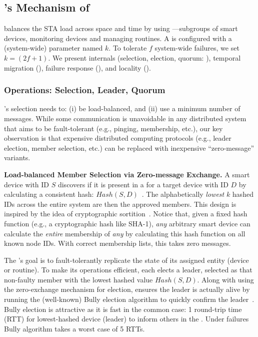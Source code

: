 \subsection{\sysname{}'s  Mechanism of \Kgroups  }
\label{comesh:section:design}

\sysname{} balances the STA load across space and time by using {\it \kgroups}---subgroups of smart devices,
monitoring devices and managing routines. 
A \kgroup{} is configured with a (system-wide)  parameter named $k$. To tolerate $f$ system-wide failures, we set $k = (2f+1)$.
We present  \kgroup{} internals (selection, election, quorum: ),
temporal migration (), failure response  (), and locality  ().

\subsubsection{\Kgroup{} Operations: Selection, Leader, Quorum}
\label{comesh:subsection:member_selection}

\sysname's \kgroup{} selection needs to: (i) be load-balanced, and (ii) use a minimum number of messages. 
While some communication is unavoidable in any distributed system that aims to be fault-tolerant (e.g., pinging, membership, etc.), our key observation is that expensive distributed computing protocols
(e.g., leader election, member selection, etc.) can be replaced with inexpensive ``zero-message'' variants.

\noindent \textbf{Load-balanced Member Selection via Zero-message Exchange.} A smart device with ID $S$ discovers if it is present in a \kgroup{} for a target device with ID $D$ by calculating a consistent hash: $Hash (S, D)$~\cite{chord,dynamo}. The alphabetically {\it lowest} $k$ hashed IDs across the entire system are then the approved \kgroup{} members. This design is inspired by the idea of cryptographic sortition~\cite{cryptosort}.
Notice that, given a fixed hash function (e.g., a cryptographic hash like SHA-1), {\it any} arbitrary smart device can calculate the {\it entire} membership of {\it any} \kgroup{} by calculating this hash function on all known node IDs.
With correct membership lists, this takes zero messages.

\label{comesh:subsection:leadr_elctn}

The \kgroup{}'s goal is to fault-tolerantly replicate the state of its assigned entity (device or routine). To make its operations efficient, each \kgroup{} elects a leader, selected as that non-faulty \kgroup{} member with the lowest hashed value $Hash (S, D)$. 
Along with using the zero-exchange mechanism for election, \sysname{} ensures the leader is actually alive by running the (well-known)  
Bully election algorithm to quickly confirm the leader~\cite{Bully}. Bully election is attractive as it is fast in the common case: 1 round-trip time (RTT) for lowest-hashed \kgroup{} device (leader) to inform others in the \kgroup{}.
Under failures Bully algorithm takes a worst case of 5 RTTs.

